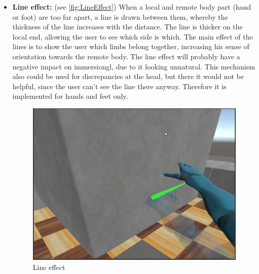 \begin{itemize}
    
    \item \textbf{Line effect:} (see \autoref{fig:LineEffect})
    \newline
    When a local and remote body part (hand or foot) are too far apart, a line is drawn between them, whereby the thickness of the line increases with the distance. The line is thicker on the local end, allowing the user to see which side is which. The main effect of the lines is to show the user which limbs belong together, increasing his sense of orientation towards the remote body. The line effect will probably have a negative impact on \gls{immersiongl}, due to it looking unnatural.
    \newline
    This mechanism also could be used for discrepancies at the head, but there it would not be helpful, since the user can't see the line there anyway. Therefore it is implemented for hands and feet only.
    \begin{figure}[h]
        \centering
        \includegraphics[height=0.2\textheight]{figures/LineEffect.png}
        \caption{Line effect}
        \label{fig:LineEffect}
    \end{figure}
    

\end{itemize}

